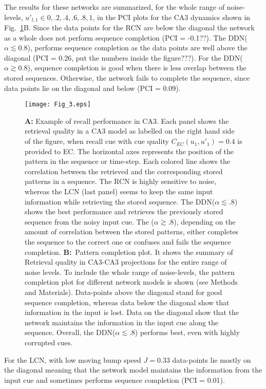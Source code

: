 \documentclass[utf8]{frontiersSCNS} %
\begin{document}
The results for these networks are summarized, for the whole range of noise-levels, $u'_{l, 1} \in  { 0, .2, .4, .6, .8, 1 } $, in the PCI plots for the CA3 dynamics shown in Fig.~\ref{Fig_3}B. Since the data points for the RCN are below the diagonal the network as a whole does not perform sequence completion (PCI = -0.1??).
% 
The DDN($\alpha \lesssim 0.8 $), performs sequence completion as the data points are well above the diagonal (PCI = 0.26, put the numbers inside the figure???). For the DDN($\alpha \gtrsim 0.8 $), sequence completion is good when there is less overlap between the stored sequences. Otherwise, the network fails to complete the sequence, since data points lie on the diagonal and below (PCI = 0.09).  
%
\begin{figure}[!htb]
\centering\texttt{[image: Fig\_3.eps]}
\caption{\textbf{A:} Example of recall performance in CA3. 
Each panel shows the retrieval quality in a CA3 model as labelled on the right hand side of the figure, when recall cue with cue quality $C_{EC}(u_1, u'_1) = 0.4$ is provided to EC.
The horizontal axes represents the position of the pattern in the sequence or time-step. Each colored line shows the correlation between the retrieved and the corresponding stored patterns in a sequence.
The RCN is highly sensitive to noise, whereas the LCN (last panel) seems to keep the same input information while retrieving the stored sequence. 
The DDN($\alpha \lesssim .8$) shows the best performance and retrieves the previously stored sequence from the noisy input cue. The ($\alpha \gtrsim .8$), depending on the amount of correlation between the stored patterns, either completes the sequence to the correct one or confuses and fails the sequence completion.
\textbf{B:}~Pattern completion plot. It shows the summary of Retrieval quality in CA3-CA3 projections for the entire range of noise levels.
To include the whole range of noise-levels, the pattern completion plot for different network models is shown (see Methods and Materials). Data-points above the diagonal stand for good sequence completion, whereas data below the diagonal show that information in the input is lost. Data on the diagonal show that the network maintains the information in the input cue along the sequence. Overall, the DDN($\alpha \lesssim .8$) performs best, even with highly corrupted cues. 
 }
\label{Fig_3}
\end{figure}
%
For the LCN, with low moving bump speed $J = 0.33$ data-points lie mostly on the diagonal meaning that the network model maintains the information from the input cue and sometimes performs sequence completion (PCI = 0.01). 
\end{document}
